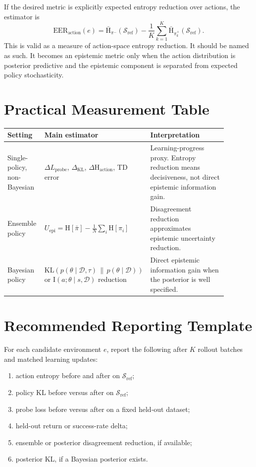 \documentclass[11pt]{article}
\newcommand{\D}{\mathcal{D}}
\newcommand{\Sref}{\mathcal{S}_{\mathrm{ref}}}
\newcommand{\KL}{\mathrm{KL}}
\newcommand{\Hent}{\mathrm{H}}
\newcommand{\I}{\mathrm{I}}
\begin{document}
If the desired metric is explicitly expected entropy reduction over actions,
the estimator is
\begin{equation}
  \mathrm{EER}_{\mathrm{action}}(e)
  =
  \bar{\Hent}_{\pi^-}(\Sref)
  -
  \frac{1}{K}\sum_{k=1}^{K}
  \bar{\Hent}_{\pi_k^+}(\Sref).
\end{equation}
This is valid as a measure of action-space entropy reduction. It should be
named as such. It becomes an epistemic metric only when the action distribution
is posterior predictive and the epistemic component is separated from expected
policy stochasticity.

\section{Practical Measurement Table}

\begin{center}
\small
\begin{tabular}{
  >{\raggedright\arraybackslash}p{0.17\linewidth}
  >{\raggedright\arraybackslash}p{0.34\linewidth}
  >{\raggedright\arraybackslash}p{0.37\linewidth}
}
\toprule
Setting & Main estimator & Interpretation \\
\midrule
Single-policy, non-Bayesian
&
$\Delta L_{\mathrm{probe}}$, $\Delta_{\mathrm{KL}}$,
$\Delta \Hent_{\mathrm{action}}$, TD error
&
Learning-progress proxy. Entropy reduction means decisiveness, not direct
epistemic information gain. \\
\addlinespace
Ensemble policy
&
$U_{\mathrm{epi}} =
\Hent[\bar{\pi}] - \frac{1}{N}\sum_i\Hent[\pi_i]$
&
Disagreement reduction approximates epistemic uncertainty reduction. \\
\addlinespace
Bayesian policy
&
$\KL(p(\theta \mid \D,\tau)\,\|\,p(\theta \mid \D))$ or
$\I(a;\theta \mid s,\D)$ reduction
&
Direct epistemic information gain when the posterior is well specified. \\
\bottomrule
\end{tabular}
\end{center}

\section{Recommended Reporting Template}

For each candidate environment $e$, report the following after $K$ rollout
batches and matched learning updates:
\begin{enumerate}[leftmargin=*]
  \item action entropy before and after on $\Sref$;
  \item policy KL before versus after on $\Sref$;
  \item probe loss before versus after on a fixed held-out dataset;
  \item held-out return or success-rate delta;
  \item ensemble or posterior disagreement reduction, if available;
  \item posterior KL, if a Bayesian posterior exists.
\end{enumerate}
\end{document}

